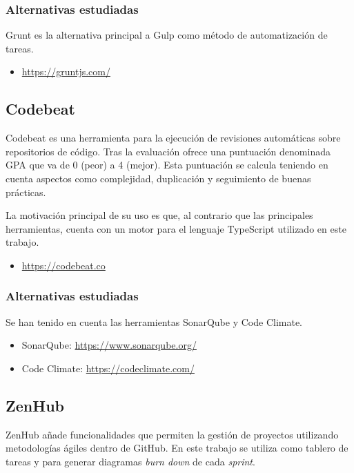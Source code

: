 \subsubsection{Alternativas estudiadas}

Grunt es la alternativa principal a Gulp como método de automatización de tareas.

\begin{itemize}
	\item \url{https://gruntjs.com/}
\end{itemize}

\subsection{Codebeat}

Codebeat es una herramienta para la ejecución de revisiones automáticas sobre repositorios de código. Tras la evaluación ofrece una puntuación denominada GPA que va de 0 (peor) a 4 (mejor). Esta puntuación se calcula teniendo en cuenta aspectos como complejidad, duplicación y seguimiento de buenas prácticas.

La motivación principal de su uso es que, al contrario que las principales herramientas, cuenta con un motor para el lenguaje TypeScript utilizado en este trabajo.

\begin{itemize}
	\item \url{https://codebeat.co}
\end{itemize}

\subsubsection{Alternativas estudiadas}

Se han tenido en cuenta las herramientas SonarQube y Code Climate.
\begin{itemize}
	\item SonarQube: \url{https://www.sonarqube.org/}
	\item Code Climate: \url{https://codeclimate.com/}
\end{itemize}

\subsection{ZenHub}

ZenHub añade funcionalidades que permiten la gestión de proyectos utilizando metodologías ágiles dentro de GitHub. En este trabajo se utiliza como tablero de tareas y para generar diagramas \textit{burn down} de cada \textit{sprint}.

